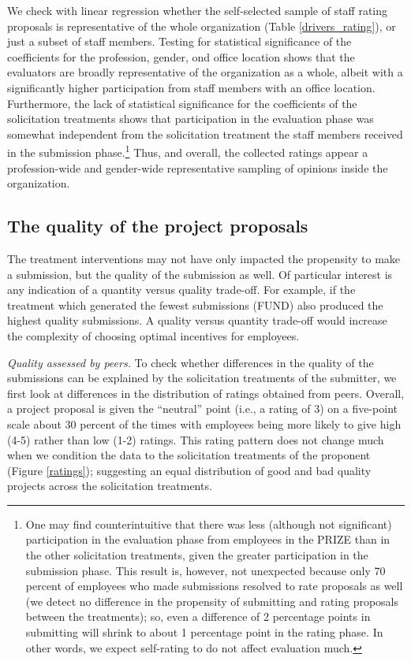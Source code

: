 \documentclass[12pt, titlepage]{article}
\begin{document}
We check with linear regression whether the self-selected sample of
staff rating proposals is representative of the whole organization
(Table \ref{drivers_rating}), or just a subset of staff members. Testing
for statistical significance of the coefficients for the profession,
gender, ond office location shows that the evaluators are broadly
representative of the organization as a whole, albeit with a
significantly higher participation from staff members with an office
location. Furthermore, the lack of statistical significance for the
coefficients of the solicitation treatments shows that participation in
the evaluation phase was somewhat independent from the solicitation
treatment the staff members received in the submission phase.\footnote{One
  may find counterintuitive that there was less (although not
  significant) participation in the evaluation phase from employees in
  the PRIZE than in the other solicitation treatments, given the greater
  participation in the submission phase. This result is, however, not
  unexpected because only 70 percent of employees who made submissions
  resolved to rate proposals as well (we detect no difference in the
  propensity of submitting and rating proposals between the treatments);
  so, even a difference of 2 percentage points in submitting will shrink
  to about 1 percentage point in the rating phase. In other words, we
  expect self-rating to do not affect evaluation much.} Thus, and
overall, the collected ratings appear a profession-wide and gender-wide
representative sampling of opinions inside the organization.

\subsection{The quality of the project
proposals}\label{the-quality-of-the-project-proposals}

The treatment interventions may not have only impacted the propensity to
make a submission, but the quality of the submission as well. Of
particular interest is any indication of a quantity versus quality
trade-off. For example, if the treatment which generated the fewest
submissions (FUND) also produced the highest quality submissions. A
quality versus quantity trade-off would increase the complexity of
choosing optimal incentives for employees.

\emph{Quality assessed by peers.} To check whether differences in the
quality of the submissions can be explained by the solicitation
treatments of the submitter, we first look at differences in the
distribution of ratings obtained from peers. Overall, a project proposal
is given the ``neutral'' point (i.e., a rating of 3) on a five-point
scale about 30 percent of the times with employees being more likely to
give high (4-5) rather than low (1-2) ratings. This rating pattern does
not change much when we condition the data to the solicitation
treatments of the proponent (Figure \ref{ratings}); suggesting an equal
distribution of good and bad quality projects across the solicitation
treatments.
\end{document}
